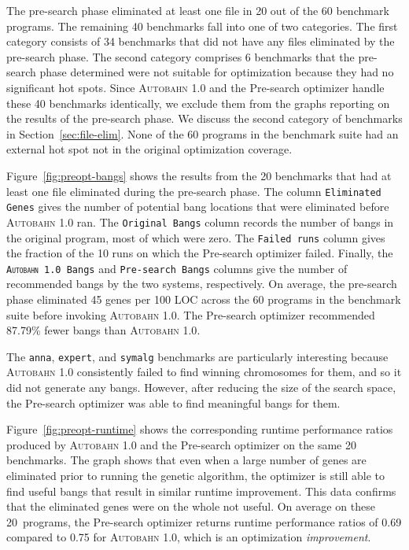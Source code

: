 \documentclass[format=sigplan, review=true, 9pt]{acmart}
\newcommand{\secref}[1]{Section~\ref{#1}}
\newcommand{\figref}[1]{Figure~\ref{#1}}
\newcommand{\hotspot}[0]{hot spot}
\newcommand{\hotspots}[0]{hot spots}
\newcommand{\useful}[0]{useful}
\newcommand{\Ao}[0]{\textsc{Autobahn 1.0}}
\newcommand{\preopt}[0]{pre-search}
\newcommand{\Preopt}[0]{Pre-search}
\newcommand{\preoptElim}[0]{45}
\newcommand{\preoptFewerBangs}[0]{87.79\%}
\newcommand{\preoptPerformance}[0]{0.69}
\newcommand{\AoPerformance}[0]{0.75}
\begin{document}
The \preopt{} phase eliminated at least one file in 20 out of the 60
benchmark programs. 
The remaining 40 benchmarks fall into one of two categories.
The first category consists of 34 benchmarks that did not have any files
eliminated by the \preopt{} phase. The second category comprises
6 benchmarks that the \preopt{} phase determined were not suitable for
optimization because they had no significant \hotspots{}. 
Since \Ao{} and the \Preopt{} optimizer handle these 40 benchmarks
identically, we exclude them from the graphs reporting on the results
of the \preopt{} phase. We discuss the second category of benchmarks in 
\secref{sec:file-elim}. None of the 60 programs in the benchmark suite
had an external \hotspot{} not in the original optimization coverage.

\figref{fig:preopt-bangs} shows the results from the 20 benchmarks that
had at least one file eliminated during the \preopt{} phase. The
column \texttt{Eliminated Genes} gives the number of potential bang
locations that were eliminated before \Ao{} ran. 
The \texttt{Original Bangs} column records the number of bangs in the
original program, most of which were zero. 
The \texttt{Failed runs} column gives the fraction of the 10 runs on
which the \Preopt{} optimizer failed. 
Finally, the \texttt{\Ao{} Bangs} and \texttt{\Preopt{} Bangs} columns
give the number of recommended bangs by the two systems,
respectively.  On average, the \preopt{} phase eliminated
\preoptElim{} genes per 100 LOC across the 60 programs in the benchmark suite before
invoking \Ao{}.
The \Preopt{} optimizer recommended \preoptFewerBangs{} fewer bangs
than \Ao{}.  


The \texttt{anna}, \texttt{expert}, and \texttt{symalg} benchmarks are
particularly interesting because \Ao{} consistently failed to find
winning chromosomes for them, and so it did not generate any bangs. However,
after reducing the size of the search space, the \Preopt{}
optimizer was able to find meaningful bangs for them.

\figref{fig:preopt-runtime} shows the corresponding runtime
performance ratios produced by \Ao{} and the \Preopt{} optimizer on
the same 20 benchmarks.
The graph shows that even when a large number of genes are
eliminated prior to running the genetic algorithm, the optimizer is still able to
find \useful{} bangs that result in similar runtime improvement. This data
confirms that the eliminated genes were on the whole not \useful{}.
On average on these 20~programs, the \Preopt{} optimizer returns
runtime performance ratios of \preoptPerformance{} compared
to \AoPerformance{} for \Ao, which is an
optimization \textit{improvement}.  
\end{document}

